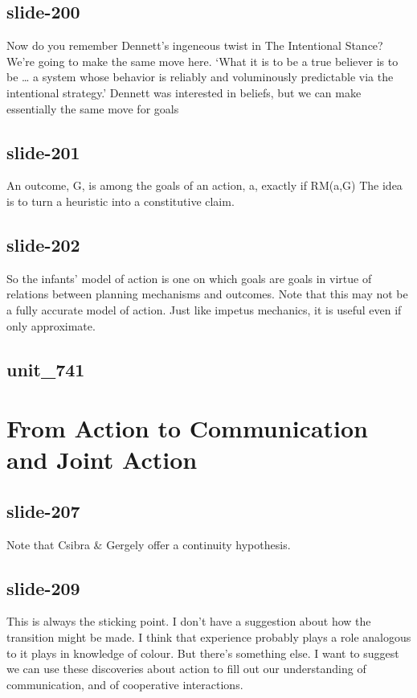 \documentclass[12pt,\papersize]{extarticle}
\begin{document}
 
\subsection{slide-200}
Now do you remember Dennett's ingeneous twist in The Intentional Stance? We're going to make the same move here.
‘What it is to be a true believer is to be … a system whose behavior is reliably and voluminously predictable via the intentional strategy.’
\citep[p.\ 15]{Dennett:1987sf}
Dennett was interested in beliefs, but we can make essentially the same move for goals
 
 
\subsection{slide-201}
An outcome, G, is among the goals of an action, a, exactly if RM(a,G)
The idea is to turn a heuristic into a constitutive claim.
 
 
\subsection{slide-202}
So the infants' model of action is one on which goals are goals in virtue of relations between planning mechanisms and outcomes.
Note that this may not be a fully accurate model of action. Just like impetus mechanics, it is useful even if only approximate.
 
 
\subsection{unit\_741}
 
\section{From Action to Communication and Joint Action}
 
 
\subsection{slide-207}
Note that Csibra \& Gergely offer a continuity hypothesis.
 
 
\subsection{slide-209}
This is always the sticking point. I don't have a suggestion about how the transition might be made. I think that experience probably plays a role analogous to it plays in knowledge of colour. But there's something else. I want to suggest we can use these discoveries about action to fill out our understanding of communication, and of cooperative interactions.
 
\end{document}
